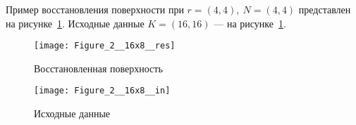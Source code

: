 

\label{sec:OCLprog}


Пример восстановления поверхности
при $r = (4,4),\ N = (4,4)$
представлен на рисунке~\ref{res_16_4}.
Исходные данные $K = (16,16)$ ---
на рисунке~\ref{res_16_4}.

\begin{figure}[h!]
  \centering
  \texttt{[image: Figure\_2\_\_16x8\_\_res]} 
  \caption{Восстановленная поверхность}
  \label{res_16_4}
\end{figure}
\FloatBarrier


\begin{figure}[h!]
  \centering
  \texttt{[image: Figure\_2\_\_16x8\_\_in]} 
  \caption{Исходные данные}
  \label{in_16_4}
\end{figure}
\FloatBarrier


%




